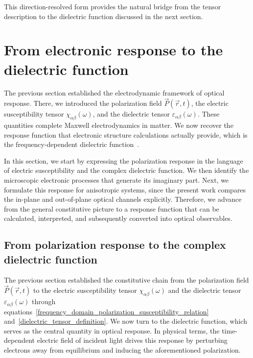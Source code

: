 This direction-resolved form provides the natural bridge from the tensor description to the dielectric function discussed in the next section.

\newpage
\section{From electronic response to the dielectric function}
\label{sec:from_electronic_response_to_dielectric_function}

The previous section established the electrodynamic framework of optical response.
There, we introduced the polarization field $\vec{P}(\vec{r},t)$,
the electric susceptibility tensor $\chi_{\alpha\beta}(\omega)$,
and the dielectric tensor $\varepsilon_{\alpha\beta}(\omega)$.
These quantities complete Maxwell electrodynamics in matter.
We now recover the response function that electronic structure calculations actually provide,
which is the frequency-dependent dielectric function~\cite{onida2002electronic,gajdovs2006linear,ambrosch2006linear}.

In this section, we start by expressing the polarization response in the language of electric susceptibility and the complex dielectric function.
We then identify the microscopic electronic processes that generate its imaginary part.
Next, we formulate this response for anisotropic systems,
since the present work compares the in-plane and out-of-plane optical channels explicitly.
Therefore, we advance from the general constitutive picture to a response function that can be calculated, interpreted, and subsequently converted into optical observables.

\subsection{From polarization response to the complex dielectric function}

The previous section established the constitutive chain from the polarization field $\vec{P}(\vec{r},t)$ to the electric susceptibility tensor $\chi_{\alpha\beta}(\omega)$ 
and the dielectric tensor $\varepsilon_{\alpha\beta}(\omega)$ through equations~\eqref{frequency_domain_polarization_susceptibility_relation} and~\eqref{dielectric_tensor_definition}.
We now turn to the dielectric function, which serves as the central quantity in optical response. 
In physical terms, the time-dependent electric field of incident light drives this response by perturbing electrons away from equilibrium and inducing the aforementioned polarization.

